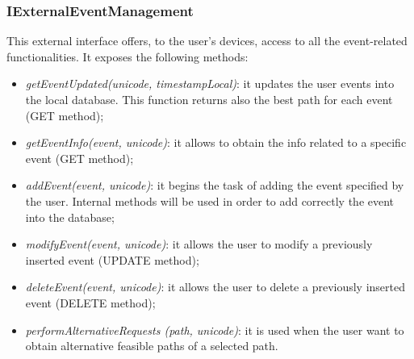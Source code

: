 \subsubsection{IExternalEventManagement}
This external interface offers, to the user's devices, access to all the event-related functionalities. It exposes the following methods:
\begin{itemize}
\item \textit{getEventUpdated(unicode, timestampLocal)}: it updates the user events into the local database. This function returns also the best path for each event (GET method);
\item \textit{getEventInfo(event, unicode)}: it allows to obtain the info related to a specific event (GET method);
\item \textit{addEvent(event, unicode)}: it begins the task of adding the event specified by the user. Internal methods will be used in order to add correctly the event into the database;
\item \textit{modifyEvent(event, unicode)}: it allows the user to modify a previously inserted event (UPDATE method);
\item \textit{deleteEvent(event, unicode)}: it allows the user to delete a previously inserted event (DELETE method);
\item \textit{performAlternativeRequests (path, unicode)}: it is used when the user want to obtain alternative feasible paths of a selected path.
\end{itemize}

